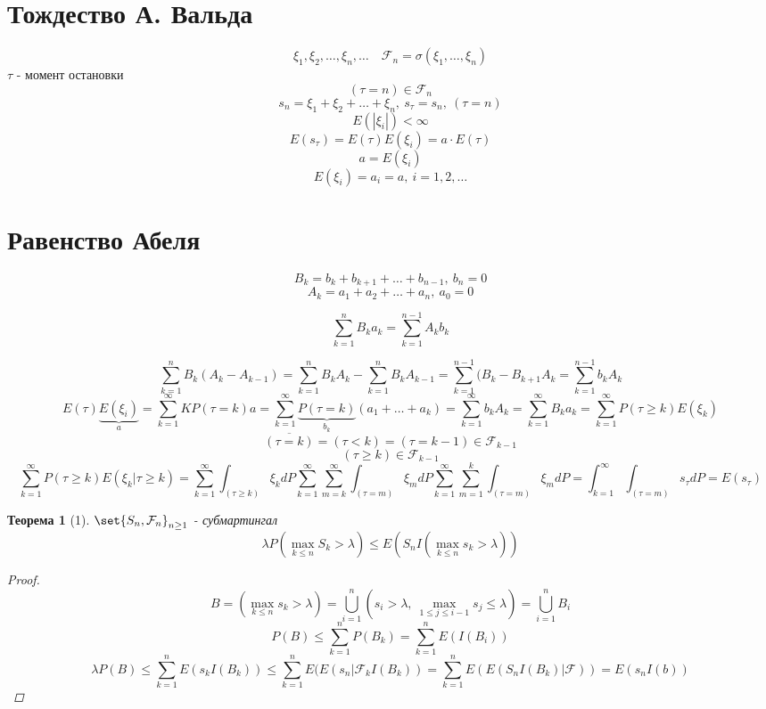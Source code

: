 \documentclass[a4paper]{article}
\DeclarePairedDelimiter\set\{\}
\newtheorem*{theorem}{Теорема}
\theoremstyle{definition}
\theoremstyle{remark}
\begin{document}
\section*{\centering Тождество А. Вальда}
\[
    \xi_1, \xi_2, \dots, \xi_n, \dots \quad \mathcal{F}_n = \sigma(\xi_1, \dots, \xi_n)
\]
$ \tau $ - момент остановки
\[
    (\tau = n) \in \mathcal{F}_n
\]
\[
    s_n = \xi_1 + \xi_2 + \dots + \xi_n, \ s_{\tau} = s_n, \ (\tau = n)
\]
\[
    E(|\xi_i|) < \infty
\]
\[
    E(s_{\tau}) = E(\tau) E(\xi_i) = a \cdot E(\tau)
\]
\[
    a = E(\xi_i)
\]
\[
    E(\xi_i) = a_i = a, \ i = 1, 2, \dots
\]

\section*{Равенство Абеля}
\[
    B_k = b_k + b_{k+1} + \dots + b_{n-1}, \ b_n = 0
\]
\[
    A_k = a_1 + a_2 + \dots + a_{n}, \ a_0 = 0
\]
\begin{tcolorbox}
    \[
        \sum_{k=1}^{n} B_k a_k = \sum_{k=1}^{n-1} A_k b_k
    \]
\end{tcolorbox}
\[
    \sum_{k=1}^{n} B_k(A_k - A_{k-1}) = \sum_{k=1}^{n} B_k A_k - 
    \sum_{k=1}^{n} B_k A_{k-1} = \sum_{k=1}^{n-1} (B_k - B_{k+1}A_k = 
    \sum_{k=1}^{n-1} b_k A_k
\]
\[
    E(\tau) \underbrace{E(\xi_i)}_{a} = \sum_{k=1}^{\infty} KP(\tau = k)a = 
    \sum_{k=1}^{\infty} \underbrace{P(\tau = k)}_{b_k} (a_1 + \dots + a_k) = 
    \sum_{k=1}^{\infty} b_k A_k = \sum_{k=1}^{\infty} B_k a_k
    = \sum_{k=1}^{\infty} P(\tau \geq k) E(\xi_k)
\]
\[
    \overline{(\tau = k)} = (\tau < k) = (\tau = k-1) \in \mathcal{F}_{k-1}
\]
\[
    (\tau \geq k) \in \mathcal{F}_{k-1}
\]
\[
    \sum_{k=1}^{\infty} P(\tau \geq k) E(\xi_k | \tau \geq k)
    = \sum_{k=1}^{\infty} \int_{(\tau \geq k)}\xi_k dP
    \sum_{k=1}^{\infty} \sum_{m=k}^{\infty} \int_{(\tau = m)} \xi_m dP
    \sum_{k=1}^{\infty} \sum_{m=1}^{k} \int_{(\tau = m)} \xi_m dP
    = \int_{k=1}^{\infty} \int_{(\tau = m)} s_{\tau}dP = E(s_{\tau})
\]

\begin{tcolorbox}
    \begin{theorem}[1]
        $ \set{S_n, \mathcal{F}_n}_{n \geq 1} $ - субмартингал
        \[
            \lambda P(\max_{k \leq n} S_k > \lambda) \leq E(S_n I(\max_{k \leq n}
            s_k > \lambda))
        \]
        \begin{proof}
            \[
                B = (\max_{k \leq n} s_k > \lambda) = \bigcup_{i=1}^{n} (s_i > \lambda, \ 
                \max_{1 \leq j \leq i-1} s_j \leq \lambda)            
                = \bigcup_{i=1}^{n}B_i
            \]
            \[
                P(B) \leq \sum_{k=1}^{n} P(B_k) = \sum_{k=1}^{n} E(I(B_i))
            \]
            \[
                \lambda P(B) \leq \sum_{k=1}^{n} E(s_k I(B_k)) \leq 
                \sum_{k=1}^{n} E(E(s_n | \mathcal{F}_k I(B_k)) = 
                \sum_{k=1}^{n} E(E(S_n I(B_k) | \mathcal{F})) = 
                E(s_n I(b))
            \]
        \end{proof}
    \end{theorem}
\end{tcolorbox}
\end{document}
